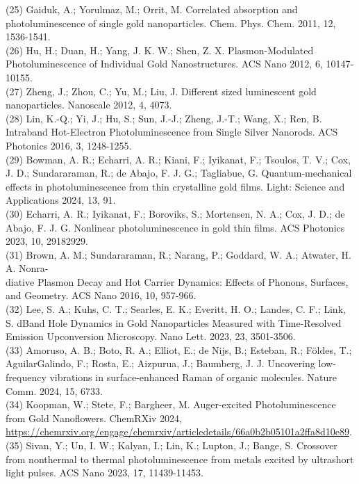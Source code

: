 \documentclass[10pt]{article}
\begin{document}
(25) Gaiduk, A.; Yorulmaz, M.; Orrit, M. Correlated absorption and photoluminescence of single gold nanoparticles. Chem. Phys. Chem. 2011, 12, 1536-1541.\\
(26) Hu, H.; Duan, H.; Yang, J. K. W.; Shen, Z. X. Plasmon-Modulated Photoluminescence of Individual Gold Nanostructures. ACS Nano 2012, 6, 10147-10155.\\
(27) Zheng, J.; Zhou, C.; Yu, M.; Liu, J. Different sized luminescent gold nanoparticles. Nanoscale 2012, 4, 4073.\\
(28) Lin, K.-Q.; Yi, J.; Hu, S.; Sun, J.-J.; Zheng, J.-T.; Wang, X.; Ren, B. Intraband Hot-Electron Photoluminescence from Single Silver Nanorods. ACS Photonics 2016, 3, 1248-1255.\\
(29) Bowman, A. R.; Echarri, A. R.; Kiani, F.; Iyikanat, F.; Tsoulos, T. V.; Cox, J. D.; Sundararaman, R.; de Abajo, F. J. G.; Tagliabue, G. Quantum-mechanical effects in photoluminescence from thin crystalline gold films. Light: Science and Applications 2024, 13, 91.\\
(30) Echarri, A. R.; Iyikanat, F.; Boroviks, S.; Mortensen, N. A.; Cox, J. D.; de Abajo, F. J. G. Nonlinear photoluminescence in gold thin films. ACS Photonics 2023, 10, 29182929.\\
(31) Brown, A. M.; Sundararaman, R.; Narang, P.; Goddard, W. A.; Atwater, H. A. Nonra-\\
diative Plasmon Decay and Hot Carrier Dynamics: Effects of Phonons, Surfaces, and Geometry. ACS Nano 2016, 10, 957-966.\\
(32) Lee, S. A.; Kuhs, C. T.; Searles, E. K.; Everitt, H. O.; Landes, C. F.; Link, S. dBand Hole Dynamics in Gold Nanoparticles Measured with Time-Resolved Emission Upconversion Microscopy. Nano Lett. 2023, 23, 3501-3506.\\
(33) Amoruso, A. B.; Boto, R. A.; Elliot, E.; de Nijs, B.; Esteban, R.; Földes, T.; AguilarGalindo, F.; Rosta, E.; Aizpurua, J.; Baumberg, J. J. Uncovering low-frequency vibrations in surface-enhanced Raman of organic molecules. Nature Comm. 2024, 15, 6733.\\
(34) Koopman, W.; Stete, F.; Bargheer, M. Auger-excited Photoluminescence from Gold Nanoflowers. ChemRXiv 2024, \href{https://chemrxiv.org/engage/chemrxiv/articledetails/66a0b2b05101a2ffa8d10e89}{https://chemrxiv.org/engage/chemrxiv/articledetails/66a0b2b05101a2ffa8d10e89}.\\
(35) Sivan, Y.; Un, I. W.; Kalyan, I.; Lin, K.; Lupton, J.; Bange, S. Crossover from nonthermal to thermal photoluminescence from metals excited by ultrashort light pulses. ACS Nano 2023, 17, 11439-11453.\\
\end{document}
